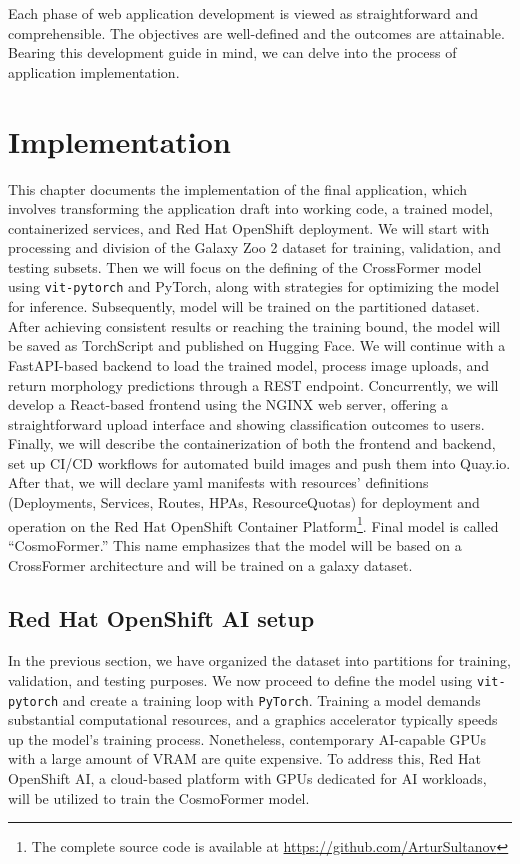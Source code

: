 Each phase of web application development is viewed as straightforward and comprehensible. The objectives are well-defined and the outcomes are attainable. Bearing this development guide in mind, we can delve into the process of application implementation.

\chapter{Implementation}
\label{chapter:implementation}

This chapter documents the implementation of the final application, which involves transforming the application draft into working code, a trained model, containerized services, and Red Hat OpenShift deployment. We will start with processing and division of the Galaxy Zoo 2 dataset for training, validation, and testing subsets. Then we will focus on the defining of the CrossFormer model using \texttt{vit-pytorch} and PyTorch, along with strategies for optimizing the model for inference. Subsequently, model will be trained on the partitioned dataset. After achieving consistent results or reaching the training bound, the model will be saved as TorchScript and published on Hugging Face. We will continue with a FastAPI-based backend to load the trained model, process image uploads, and return morphology predictions through a REST endpoint. Concurrently, we will develop a React-based frontend using the NGINX web server, offering a straightforward upload interface and showing classification outcomes to users. Finally, we will describe the containerization of both the frontend and backend, set up CI/CD workflows for automated build images and push them into Quay.io. After that, we will declare yaml manifests with resources' definitions (Deployments, Services, Routes, HPAs, ResourceQuotas) for deployment and operation on the Red Hat OpenShift Container Platform\footnote{The complete source code is available at \url{https://github.com/ArturSultanov}}. Final model is called \enquote{CosmoFormer.} This name emphasizes that the model will be based on a CrossFormer architecture and will be trained on a galaxy dataset.

\section{Red Hat OpenShift AI setup}

In the previous section, we have organized the dataset into partitions for training, validation, and testing purposes. We now proceed to define the model using \texttt{vit-pytorch} and create a training loop with \texttt{PyTorch}. Training a model demands substantial computational resources, and a graphics accelerator typically speeds up the model’s training process. Nonetheless, contemporary AI-capable GPUs with a large amount of VRAM are quite expensive. To address this, Red Hat OpenShift AI, a cloud-based platform with GPUs dedicated for AI workloads, will be utilized to train the CosmoFormer model.

